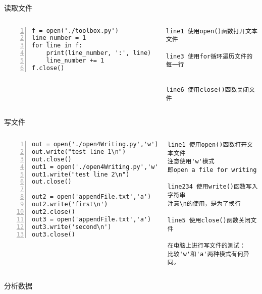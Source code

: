 \documentclass{beamer}
\begin{document}
\begin{frame}[fragile]{读取文件}

\begin{columns}
\begin{Verbatim}[numbers=left,frame=single,rulecolor=\color{red}]
f = open('./toolbox.py')
line_number = 1
for line in f:
    print(line_number, ':', line)
    line_number += 1
f.close()
\end{Verbatim}
\tiny{
\begin{Verbatim}[numbers=none,frame=none,rulecolor=\color{red}]
line1 使用open()函数打开文本文件

line3 使用for循环遍历文件的每一行

  
line6 使用close()函数关闭文件
\end{Verbatim}
}
\end{columns}
\end{frame}

\begin{frame}[fragile]{写文件}

\begin{columns}
\begin{Verbatim}[numbers=left,frame=single,rulecolor=\color{red}]
out = open('./open4Writing.py','w')
out.write("test line 1\n")
out.close()
out1 = open('./open4Writing.py','w')
out1.write("test line 2\n")
out.close()

out2 = open('appendFile.txt','a')
out2.write('first\n')
out2.close()
out3 = open('appendFile.txt','a')
out3.write('second\n')
out3.close()
\end{Verbatim}
\tiny{
\begin{Verbatim}[numbers=none,frame=none,rulecolor=\color{red}]
line1 使用open()函数打开文本文件
注意使用'w'模式
即open a file for writing

line234 使用write()函数写入字符串
注意\n的使用，是为了换行
  
line5 使用close()函数关闭文件

在电脑上进行写文件的测试：
比较'w'和'a'两种模式有何异同。
\end{Verbatim}
}
\end{columns}
\end{frame}
\begin{frame}{分析数据}
\end{frame}
\end{document}

